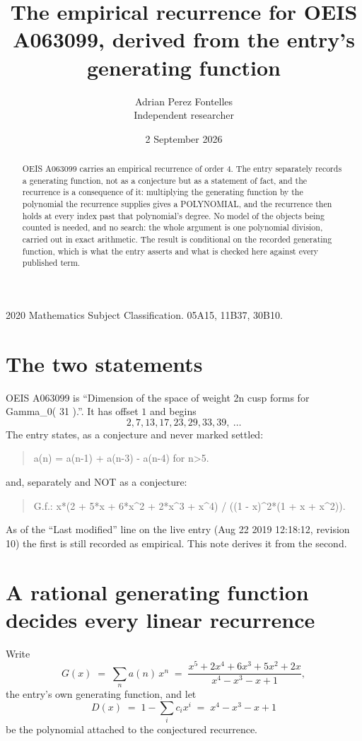 \documentclass[11pt,a4paper]{article}
\title{The empirical recurrence for OEIS A063099, derived from the entry's generating function}
\author{Adrian Perez Fontelles\\ \small Independent researcher}
\date{2 September 2026}
\theoremstyle{plain}
\theoremstyle{definition}
\begin{document}
\maketitle

\begin{abstract}
OEIS A063099 carries an empirical recurrence of order $4$. The entry separately records a
generating function, not as a conjecture but as a statement of fact, and the recurrence is a
consequence of it: multiplying the generating function by the polynomial the recurrence
supplies gives a POLYNOMIAL, and the recurrence then holds at every index past that
polynomial's degree. No model of the objects being counted is needed, and no search: the
whole argument is one polynomial division, carried out in exact arithmetic. The result is
conditional on the recorded generating function, which is what the entry asserts and what is
checked here against every published term.
\end{abstract}

\noindent\small 2020 Mathematics Subject Classification. 05A15, 11B37, 30B10.\normalsize

\section{The two statements}

OEIS A063099 is ``Dimension of the space of weight 2n cusp forms for Gamma\_0( 31 ).''. It has offset $1$ and begins
\[
2, 7, 13, 17, 23, 29, 33, 39,\ \dots
\]
The entry states, as a conjecture and never marked settled:
\begin{quote}
a(n) = a(n-1) + a(n-3) - a(n-4) for n>5.
\end{quote}
and, separately and NOT as a conjecture:
\begin{quote}
G.f.: x*(2 + 5*x + 6*x\^{}2 + 2*x\^{}3 + x\^{}4) / ((1 - x)\^{}2*(1 + x + x\^{}2)).
\end{quote}
As of the ``Last modified'' line on the live entry (Aug 22 2019 12:18:12, revision 10) the first is still
recorded as empirical. This note derives it from the second.

\section{A rational generating function decides every linear recurrence}

Write
\[
G(x)\;=\;\sum_{n}a(n)\,x^{n}\;=\;\frac{x^{5} + 2 x^{4} + 6 x^{3} + 5 x^{2} + 2 x}{x^{4} - x^{3} - x + 1},
\]
the entry's own generating function, and let
\[
D(x)\;=\;1-\sum_i c_i x^{i}\;=\;x^{4} - x^{3} - x + 1
\]
be the polynomial attached to the conjectured recurrence.
\end{document}

